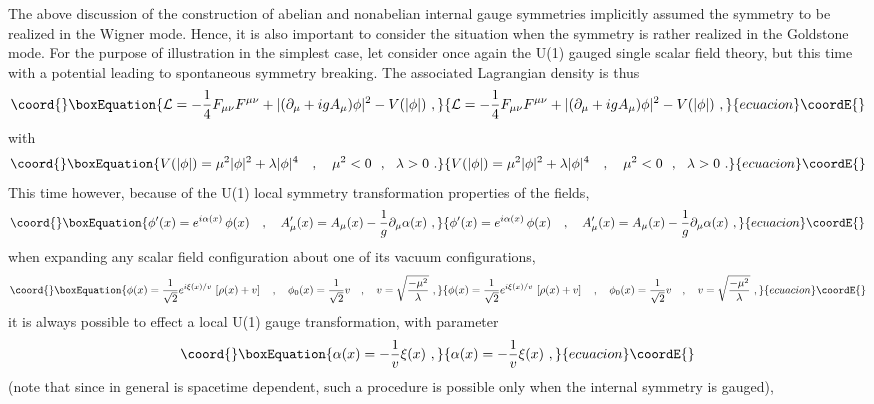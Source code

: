 \documentclass[a4paper,11pt]{article}
\begin{document}
The above discussion of the construction of abelian and nonabelian internal
gauge symmetries implicitly assumed the symmetry to be realized in the Wigner
mode. Hence, it is also important to consider the situation when the
symmetry is rather realized in the Goldstone mode. For the purpose
of illustration in the simplest case, let consider once again the
U(1) gauged single scalar field theory, but this time with a potential
leading to spontaneous symmetry breaking. The associated Lagrangian
density is thus
\begin{equation}\coord{}\boxEquation{
{\cal L}=-\frac{1}{4}F_{\mu\nu}F^{\mu\nu}+|(\partial_\mu+igA_\mu)\phi|^2-
V(|\phi|)\ ,
}{
{\cal L}=-\frac{1}{4}F_{\mu\nu}F^{\mu\nu}+|(\partial_\mu+igA_\mu)\phi|^2-
V(|\phi|)\ ,
}{ecuacion}\coordE{}\end{equation}
with
\begin{equation}\coord{}\boxEquation{
V(|\phi|)=\mu^2|\phi|^2+\lambda|\phi|^4\ \ \ ,\ \ \ 
\mu^2<0\ \ ,\ \ \lambda>0\ .
}{
V(|\phi|)=\mu^2|\phi|^2+\lambda|\phi|^4\ \ \ ,\ \ \ 
\mu^2<0\ \ ,\ \ \lambda>0\ .
}{ecuacion}\coordE{}\end{equation}
This time however, because of the U(1) local symmetry transformation 
pro\-per\-ties of the fields,
\begin{equation}\coord{}\boxEquation{
\phi'(x)=e^{i\alpha(x)}\,\phi(x)\ \ \ ,\ \ \ 
A'_\mu(x)=A_\mu(x)-\frac{1}{g}\partial_\mu\alpha(x)\ ,
}{
\phi'(x)=e^{i\alpha(x)}\,\phi(x)\ \ \ ,\ \ \ 
A'_\mu(x)=A_\mu(x)-\frac{1}{g}\partial_\mu\alpha(x)\ ,
}{ecuacion}\coordE{}\end{equation}
when expanding any scalar field configuration about one of its vacuum
configurations,
\begin{equation}\coord{}\boxEquation{
\phi(x)=\frac{1}{\sqrt{2}}e^{i\xi(x)/v}\,\left[\rho(x)+v\right]\ \ \ ,\ \ \ 
\phi_0(x)=\frac{1}{\sqrt{2}}v\ \ \ ,\ \ \ 
v=\sqrt{\frac{-\mu^2}{\lambda}}\ ,
}{
\phi(x)=\frac{1}{\sqrt{2}}e^{i\xi(x)/v}\,\left[\rho(x)+v\right]\ \ \ ,\ \ \ 
\phi_0(x)=\frac{1}{\sqrt{2}}v\ \ \ ,\ \ \ 
v=\sqrt{\frac{-\mu^2}{\lambda}}\ ,
}{ecuacion}\coordE{}\end{equation}
it is always possible to effect a local U(1) gauge transformation, with
pa\-ra\-me\-ter
\begin{equation}\coord{}\boxEquation{
\alpha(x)=-\frac{1}{v}\xi(x)\ ,
}{
\alpha(x)=-\frac{1}{v}\xi(x)\ ,
}{ecuacion}\coordE{}\end{equation}
(note that since in general \coordHE{} is spacetime dependent, such a
procedure is possible only when the internal symmetry is gauged),
\end{document}
